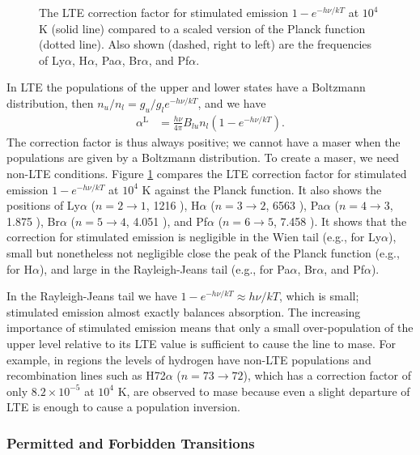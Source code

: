 \begin{figure}
\centering

\caption{The LTE correction factor for stimulated emission $1 -
e^{-h\nu/kT}$ at $10^4$ K (solid line) compared to a scaled
version of the Planck function (dotted line). Also shown (dashed, right to left) are
the frequencies of Ly$\alpha$, H$\alpha$, Pa$\alpha$,
Br$\alpha$, and Pf$\alpha$.}
\label{figure-stimulated-emssion}
\end{figure}

In LTE the populations of the upper and lower states have a
Boltzmann distribution, then $n_u / n_l = g_u/g_l
e^{-h\nu/kT}$, and we have
\begin{align}
\alpha^\mathrm{L} &= \frac{h\nu}{4\pi} B_{lu} n_l 
(1 - e^{-h\nu/kT}).
\end{align}
The correction factor is thus always positive; we cannot
have a maser when the populations are given by a Boltzmann
distribution. To create a maser, we need non-LTE conditions.
Figure \ref{figure-stimulated-emssion} compares the LTE
correction factor for stimulated emission $1 - e^{-h\nu/kT}$
at $10^4$ K against the Planck function. It also shows the
positions of Ly$\alpha$ ($n = 2\rightarrow1$, 1216 {\Angstrom}),
H$\alpha$ ($n=3\rightarrow2$, 6563 {\Angstrom}), Pa$\alpha$
($n=4\rightarrow3$, 1.875 {\micron}), Br$\alpha$ ($n=5\rightarrow4$, 4.051
{\micron}), and Pf$\alpha$ ($n=6\rightarrow5$, 7.458 {\micron}). It
shows that the correction for stimulated emission is
negligible in the Wien tail (e.g., for Ly$\alpha$), small
but nonetheless not negligible close the peak of the Planck
function (e.g., for H$\alpha$), and large in the
Rayleigh-Jeans tail (e.g., for Pa$\alpha$, Br$\alpha$, and
Pf$\alpha$).

In the Rayleigh-Jeans tail we have $1 - e^{-h\nu/kT} \approx
h\nu/kT$, which is small; stimulated emission almost exactly
balances absorption. The increasing importance of stimulated
emission means that only a small
over-population of the upper level relative to its LTE value
is sufficient to cause the line to mase. For example, in
 regions the levels of hydrogen have non-LTE
populations and recombination lines such as H72$\alpha$
($n=73\rightarrow72$), which has a correction factor of only $8.2\times10^{-5}$ at $10^4$ K, are
observed to mase because even a slight departure of LTE is
enough to cause a population inversion.

\subsubsection{Permitted and Forbidden Transitions}

